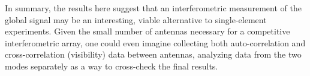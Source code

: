 \documentclass[twocolumn,apj,numberedappendix]{emulateapj}
\newcommand{\xhat}{\hat{\mathbf{x}}}
\newcommand{\y}{\mathbf{y}}
\newcommand{\Nfg}{\mathbf{N}_{\textrm{fg}}}
\newcommand{\mep}[1]{}
\begin{document}
In summary, the results here suggest that an interferometric measurement of the global signal may be an interesting, viable alternative to single-element experiments. Given the small number of antennas necessary for a competitive interferometric array, one could even imagine collecting both auto-correlation and cross-correlation (visibility) data between antennas, analyzing data from the two modes separately as a way to cross-check the final results.


%
%
%
%
%
\end{document}
